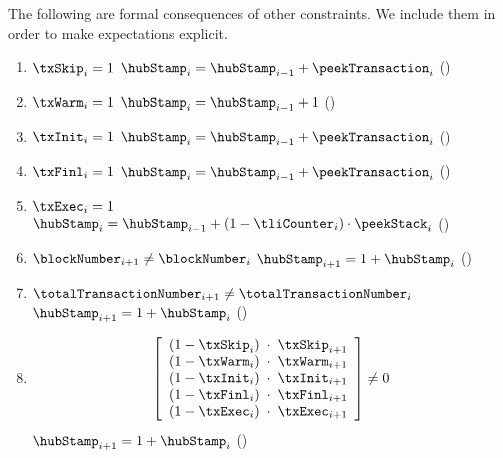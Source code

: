 The following are formal consequences of other constraints.
We include them in order to make expectations explicit.
\begin{enumerate}
	\item \label{hub: system: hub stamp: entry increments: SKIP case} \If $\txSkip _{i} = 1$ \Then $\hubStamp _{i} = \hubStamp _{i - 1} + \peekTransaction _{i}$ (\sanityCheck)
	\item \label{hub: system: hub stamp: entry increments: WARM case} \If $\txWarm _{i} = 1$ \Then $\hubStamp _{i} = \hubStamp _{i - 1} + 1$ (\sanityCheck)
	\item \label{hub: system: hub stamp: entry increments: INIT case} \If $\txInit _{i} = 1$ \Then $\hubStamp _{i} = \hubStamp _{i - 1} + \peekTransaction _{i}$ (\sanityCheck)
	\item \label{hub: system: hub stamp: entry increments: FINL case} \If $\txFinl _{i} = 1$ \Then $\hubStamp _{i} = \hubStamp _{i - 1} + \peekTransaction _{i}$ (\sanityCheck)
	\item \label{hub: system: hub stamp: entry increments: EXEC case} \If $\txExec _{i} = 1$ \Then $\hubStamp _{i} = \hubStamp _{i - 1} + (1 - \tliCounter _{i}) \cdot \peekStack _{i}$ (\sanityCheck)
	\item \If $\blockNumber            _{i + 1} \neq \blockNumber            _{i}$ \Then $\hubStamp _{i + 1} = 1 + \hubStamp _{i}$ (\sanityCheck)
	\item \If $\totalTransactionNumber _{i + 1} \neq \totalTransactionNumber _{i}$ \Then $\hubStamp _{i + 1} = 1 + \hubStamp _{i}$ (\sanityCheck)
        \item \If
		\[
			\left[ \begin{array}{lcl}
				(1 - \txSkip _{i}) & \!\!\!\cdot\!\!\! & \txSkip _{i + 1} \\
				(1 - \txWarm _{i}) & \!\!\!\cdot\!\!\! & \txWarm _{i + 1} \\
				(1 - \txInit _{i}) & \!\!\!\cdot\!\!\! & \txInit _{i + 1} \\
				(1 - \txFinl _{i}) & \!\!\!\cdot\!\!\! & \txFinl _{i + 1} \\
				(1 - \txExec _{i}) & \!\!\!\cdot\!\!\! & \txExec _{i + 1} \\
			\end{array} \right]
			\neq 0
		\]
		\Then $\hubStamp _{i + 1} = 1 + \hubStamp _{i}$ (\sanityCheck)
\end{enumerate}
